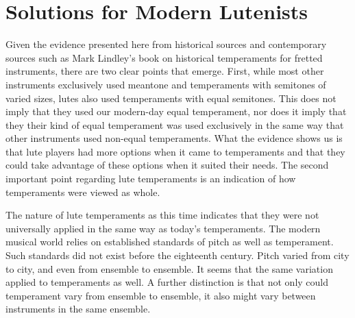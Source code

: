 \chapter{Solutions for Modern Lutenists}

Given the evidence presented here from historical sources and contemporary sources such
as Mark Lindley's book on historical temperaments for fretted instruments, there are
two clear points that emerge.  First, while most other instruments exclusively used meantone and
temperaments with semitones of varied sizes, lutes also used temperaments with equal
semitones.  This does not imply that they used our modern-day equal temperament, nor
does it imply that they their kind of equal temperament was used exclusively in the same
way that other instruments used non-equal temperaments.  What the evidence shows us is
that lute players had more options when it came to temperaments and that they could take
advantage of these options when it suited their needs.  The second important point
regarding lute temperaments is an indication of how temperaments were viewed as whole.

The nature of lute temperaments as this time indicates that they were not universally
applied in the same way as today's temperaments.  The modern musical world relies on
established standards of pitch as well as temperament.  Such standards did not exist
before the eighteenth century.  Pitch varied from city to city, and even from ensemble
to ensemble.  It seems that the same variation applied to temperaments as well.  A
further distinction is that not only could temperament vary from ensemble to
ensemble, it also might vary between instruments in the same ensemble.

%
%
%
%
%
%